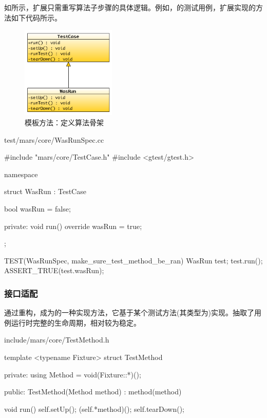\begin{content}
如所示，扩展只需重写算法子步骤的具体逻辑。例如，的测试用例，扩展实现的方法如下代码所示。

\begin{figure}[H]
\centering
\includegraphics[width=0.4\textwidth]{figures/xunit/simple-test.png}
\caption{模板方法：定义算法骨架}
 \label{fig:simple-test}
\end{figure}

\begin{nodiff}{test/mars/core/WasRunSpec.cc}
 \begin{c++}
#include "mars/core/TestCase.h"
#include <gtest/gtest.h>

namespace {
  struct WasRun : TestCase {
    bool wasRun = false;

  private:
    void run() override {
      wasRun = true;
    }
  };
}

TEST(WasRunSpec, make_sure_test_method_be_ran) {
  WasRun test;
  test.run();
  ASSERT_TRUE(test.wasRun);
}
  \end{c++}
\end{nodiff}

\subsubsection{接口适配}

通过重构，成为的一种实现方法，它基于某个测试方法(其类型为)实现。抽取了用例运行时完整的生命周期，相对较为稳定。

\begin{diff}{include/mars/core/TestMethod.h}
 \begin{minicpp}
template <typename Fixture>
struct TestMethod {
private:
  using Method = void(Fixture::*)();

public:
  TestMethod(Method method)
    : method(method) {}

  void run() {
    self.setUp();
    (self.*method)();
    self.tearDown();
  }

}
\end{minicpp}
\end{diff}
\end{content}
